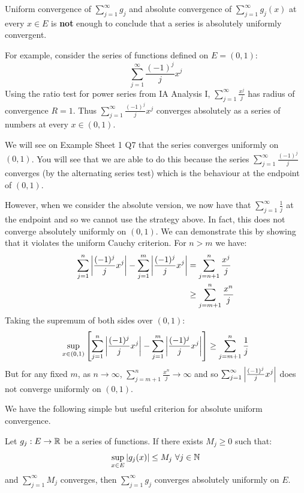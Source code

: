 \documentclass[../main.tex]{subfiles}
\begin{document}
\begin{remark}
  Uniform convergence of $\sum_{j = 1}^{\infty} g_j$ and absolute convergence of $\sum_{j = 1}^{\infty} g_j(x)$ at every $x \in E$ is \textbf{not} enough to conclude that a series is absolutely uniformly convergent.

  For example, consider the series of functions defined on $E = (0, 1)$:
  \[
    \sum_{j = 1}^{\infty} \frac{(-1)^j}{j} x^j
  \]
  Using the ratio test for power series from IA Analysis I, $\sum_{j = 1}^{\infty} \frac{x^j}{j}$ has radius of convergence $R = 1$.
  Thus $\sum_{j = 1}^{\infty} \frac{(-1)^j}{j} x^j$ converges absolutely as a series of numbers at every $x \in (0, 1)$.

  We will see on Example Sheet 1 Q7 that the series converges uniformly on $(0, 1)$.
  You will see that we are able to do this because the series $\sum_{j = 1}^{\infty} \frac{(-1)^j}{j}$ converges (by the alternating series test) which is the behaviour at the endpoint of $(0, 1)$.

  However, when we consider the absolute version, we now have that $\sum_{j = 1}^{\infty} \frac{1}{j}$ at the endpoint and so we cannot use the strategy above.
  In fact, this does not converge absolutely uniformly on $(0, 1)$.
  We can demonstrate this by showing that it violates the uniform Cauchy criterion.
  For $n > m$ we have:
  \begin{align*}
    \sum_{j = 1}^{n} \left\lvert \frac{(-1)^j}{j} x^j \right\rvert - \sum_{j = 1}^{m} \left\lvert \frac{(-1)^j}{j} x^j \right\rvert &= \sum_{j = n + 1}^{n} \frac{x^j}{j} \\
                                                                                              &\geq \sum_{j = m + 1}^{n}\frac{x^n}{j}
  \end{align*}
  Taking the supremum of both sides over $(0, 1)$:
  \[
    \sup_{x \in (0, 1)} \left[\sum_{j = 1}^{n} \left\lvert \frac{(-1)^j}{j} x^j \right\rvert - \sum_{j = 1}^{m} \left\lvert \frac{(-1)^j}{j} x^j \right\rvert\right] \geq \sum_{j = m + 1}^{n} \frac{1}{j}
  \]
  But for any fixed $m$, as $n \to \infty$, $\sum_{j = m + 1}^{n} \frac{x^{n}}{j} \to \infty$ and so $\sum_{j = 1}^{\infty} \left\lvert \frac{(-1)^j}{j} x^j \right\rvert$ does not converge uniformly on $(0, 1)$.
\end{remark}
We have the following simple but useful criterion for absolute uniform convergence.
\begin{theorem}
  Let $g_j: E \to \mathbb{R}$ be a series of functions.
  If there exists $M_j \geq 0$ such that: \label{MTest}
  \[
    \sup_{x \in E} |g_j(x)| \leq M_j\ \forall j \in \mathbb{N}
  \]
  and $\sum_{j = 1}^{\infty} M_j$ converges, then $\sum_{j = 1}^{\infty} g_j$ converges absolutely uniformly on $E$.
\end{theorem}
\end{document}
